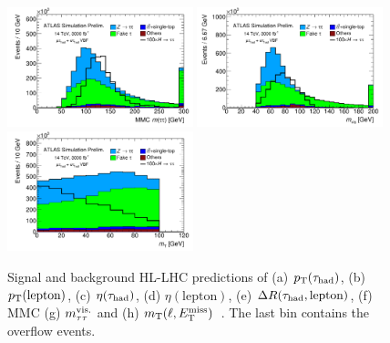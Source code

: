 \begin{figure}[!htpb]
  \includegraphics[width=0.48\textwidth]{figures/ATL-PHYS-PUB-2014-018/fig_04f}
  \includegraphics[width=0.48\textwidth]{figures/ATL-PHYS-PUB-2014-018/fig_04g}
  \includegraphics[width=0.48\textwidth]{figures/ATL-PHYS-PUB-2014-018/fig_04h}
  \caption{Signal and background HL-LHC predictions of (a) $p_{\mathrm{T}}(\tau_\text{had})$, (b) $p_{\mathrm{T}}(\text{lepton})$, (c) $\eta(\tauh)$, (d) $\eta(\text{lepton})$, (e) $\Delta R(\tau_\text{had}, \text{lepton})$, (f) MMC (g) $m_{\tau\tau}^\text{vis.}$ and (h) $m_\text{T}(\ell, E_{\mathrm{T}}^{\mathrm{miss}})$~\cite{ATL-PHYS-PUB-2014-018}. The last bin contains the overflow events.}
  \label{fig:prospects-hllhc-taus}
\end{figure}

